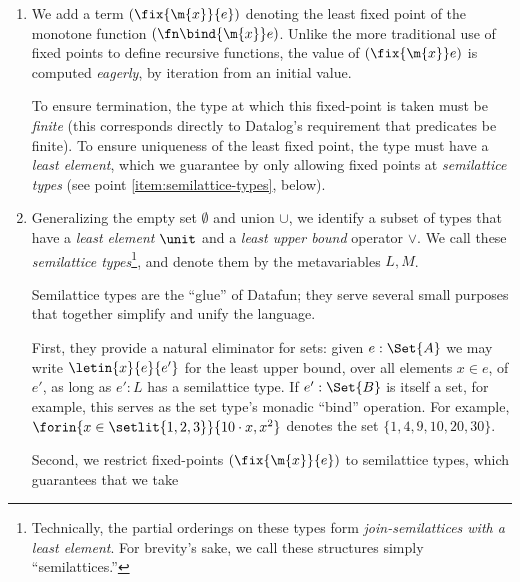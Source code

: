 \begin{enumerate}
\item We add a term $(\fix{\m{x}}{e})$ denoting the least fixed point of the
  monotone function $(\fn\bind{\m{x}} e)$. Unlike the more traditional use of
  fixed points to define recursive functions, the value of $(\fix{\m{x}} e)$ is
  computed \emph{eagerly}, by iteration from an initial value.


  To ensure termination, the type at which this fixed-point is taken must be
  \emph{finite} (this corresponds directly to Datalog's requirement that
  predicates be finite). To ensure uniqueness of the least fixed point, the type
  must have a \emph{least element}, which we guarantee by only allowing fixed
  points at \emph{semilattice types} (see point \ref{item:semilattice-types},
  below).

\item\label{item:semilattice-types} Generalizing the empty set $\emptyset$ and
  union $\cup$, we identify a subset of types that have a \emph{least element}
  $\unit$ and a \emph{least upper bound} operator $\vee$. We call these
  \emph{semilattice types}\footnote{Technically, the partial orderings on these
    types form \emph{join-semilattices with a least element}. For brevity's
    sake, we call these structures simply ``semilattices.''}, and denote them by
  the metavariables $L,M$.

  Semilattice types are the ``glue'' of Datafun; they serve several small
  purposes that together simplify and unify the language.

  First, they provide a natural eliminator for sets: given $e : \Set{A}$ we may
  write $\letin{x}{e}{e'}$ for the least upper bound, over all elements $x \in
  e$, of $e'$, as long as $e' : L$ has a semilattice type. If $e' : \Set{B}$ is
  itself a set, for example, this serves as the set type's monadic ``bind''
  operation. For example, $\forin{x \in \setlit{1,2,3}} \{10 \cdot x, x^2\}$
  denotes the set $\{1, 4, 9, 10, 20, 30\}$.


  Second, we restrict fixed-points $(\fix{\m{x}}{e})$ to semilattice types,
  which guarantees that we take



\end{enumerate}
